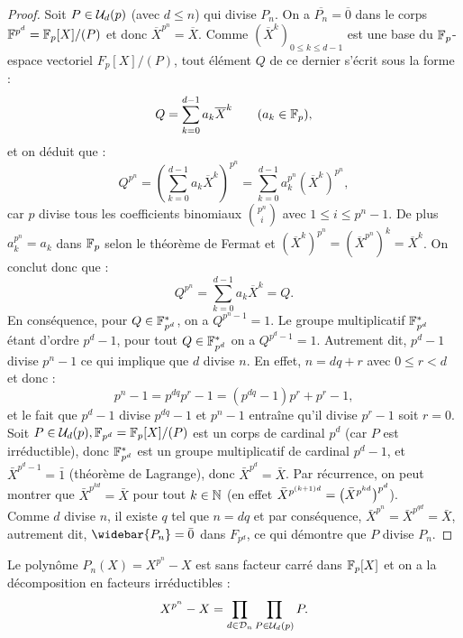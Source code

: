 \begin{proof}
Soit $P \in \mathcal{U}_d(p)$ (avec $d \leq n$) qui divise $P_n$.
On a $\overline{P_n} = \overline{0}$ dans le corps $\mathbb{F}^{p^d}=\mathbb{F}_p[X]/(P)$ et donc $\overline{X}^{p^n} = \overline{X}$. 
Comme $(\overline{X}^k)_{0 \leq k \leq d-1}$ est une base du $\mathbb{F}_p$-espace vectoriel $F_p[X]/(P)$, tout élément $Q$ de ce dernier
s'écrit sous la forme :
\[ Q = \sum_{k=0}^{d-1} a_k \overline{X}^k \qquad (a_k \in \mathbb{F}_p) , \]
et on déduit que :
\[ Q^{p^n} = \left ( \sum_{k=0}^{d-1} a_k \overline{X}^k \right )^{p^n} 
	= \sum_{k=0}^{d-1} a_k^{p^n} \left ( \overline{X}^k \right )^{p^n} , \]
car $p$ divise tous les coefficients binomiaux $\binom{p^n}{i}$ avec $1 \leq i \leq p^n-1$.
De plus $a_k^{p^n} = a_k$ dans $\mathbb{F}_p$ selon le théorème de Fermat 
et $\left ( \overline{X}^k \right )^{p^n} = \left ( \overline{X}^{p^n} \right)^k = \overline{X}^k$.
On conclut donc que :
\[ Q^{p^n} = \sum_{k=0}^{d-1} a_k \overline{X}^k = Q . \]
En conséquence, pour $Q \in \mathbb{F}_{p^d}^{\ast}$, on a $Q^{p^n-1} = 1$.
Le groupe multiplicatif $\mathbb{F}_{p^d}^{\ast}$ étant d'ordre $p^d-1$, pour tout $Q \in \mathbb{F}_{p^d}^{\ast}$ on a $Q^{p^d-1} = 1$.
Autrement dit, $p^d-1$ divise $p^n-1$ ce qui implique que $d$ divise $n$.
En effet, $n=dq+r$ avec $0 \leq r < d$ et donc :
\[ p^n-1 = p^{dq} p^r - 1 = (p^{dq}-1)p^r + p^r - 1 , \]
et le fait que $p^d-1$ divise $p^{dq}-1$ et $p^n-1$ entraîne qu'il divise $p^r-1$ soit $r=0$. \\

Soit $P \in \mathcal{U}_d(p), \mathbb{F}_{p^d} = \mathbb{F}_p[X]/(P)$ est un corps de cardinal $p^d$ (car $P$ est irréductible), 
donc $\mathbb{F}_{p^d}^{\ast}$ est un groupe multiplicatif de cardinal $p^d-1$,
et $\bar{X}^{p^d-1} = \bar{1}$ (théorème de Lagrange), donc $\bar{X}^{p^d} = \bar{X}$. Par récurrence, on peut montrer que 
$\bar{X}^{p^{kd}} = \bar{X}$ pour tout $k \in \mathbb{N}$ (en effet $\bar{X}^{p^{(k+1)d}} = \bigl(  \bar{X}^{p^{kd}}  \bigr)^{p^d}$). \\
Comme $d$ divise $n$, il existe $q$ tel que $n=dq$ et par conséquence, $\bar{X}^{p^n} = \bar{X}^{p^{qd}} = \bar{X}$, 
autrement dit, $\widebar{P_n} = \bar{0}$ dans $F_{p^d}$, ce qui démontre que $P$ divise $P_n$.
\end{proof}

\begin{thm}
Le polynôme $P_n(X) = X^{p^n} - X$ est sans facteur carré dans $\mathbb{F}_p[X]$ et on a la décomposition en facteurs irréductibles :
\[ X^{p^n} - X = \prod_{d \in \mathcal{D}_n} \prod_{P \in \mathcal{U}_d(p)} P . \]
\end{thm}

